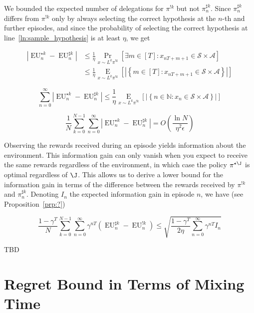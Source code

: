 \documentclass[anon,12pt]{colt2018} %
\newcommand{\AP}[1]{\left(#1\right)}
\newcommand{\AB}[1]{\left[#1\right]}
\newcommand{\AC}[1]{\left\{#1\right\}}
\newcommand{\Pa}[2]{\underset{#1}{\operatorname{Pr}}\AB{#2}}
\newcommand{\Ea}[2]{\underset{#1}{\operatorname{E}}\AB{#2}}
\newcommand{\Nats}{\mathbb{N}}
\newcommand{\Abs}[1]{\left\vert #1 \right\vert}
\newcommand{\A}{\mathcal{A}}
\newcommand{\St}{\mathcal{S}}
\newcommand{\EU}{\operatorname{EU}}
\begin{document}
We bounded the expected number of delegations for $\pi^{!k}$ but not $\pi^{\sharp k}_n$. Since $\pi^{\sharp k}_n$ differs from $\pi^{!k}$ only by always selecting the correct hypothesis at the $n$-th and further episodes, and since the probability of selecting the correct hypothesis at line~\ref{ln:sample_hypothesis} is at least $\eta$, we get

\begin{align*}
\Abs{\EU^{\star k}_n-\EU^{\sharp k}_n} &\leq \frac{1}{\eta}\Pa{x\sim L^k\pi^{!k}}{\exists m \in [T]: x_{nT+m+1}\in\St \times \A} \\ 
&\leq \frac{1}{\eta}\Ea{x\sim L^k\pi^{!k}}{\Abs{\AC{m \in [T]: x_{nT+m+1}\in\St \times \A}}}
\end{align*}

\[\sum_{n=0}^\infty {\Abs{\EU^{\star k}_n-\EU^{\sharp k}_n}} \leq \frac{1}{\eta}\Ea{x\sim L^k\pi^{!k}}{\Abs{\AC{n \in \Nats: x_n\in\St \times \A}}}\]

\begin{equation}
\frac{1}{N}\sum_{k=0}^{N-1}\sum_{n=0}^\infty {\Abs{\EU^{\star k}_n-\EU^{\sharp k}_n}} = O\AP{\frac{\ln{N}}{\eta^2\epsilon}}
\end{equation}

Observing the rewards received during an episode yields information about the environment. This information gain can only vanish when you expect to receive the same rewards regardless of the environment, in which case the policy $\pi^{\star\J}$ is optimal regardless of $\J$. This allows us to derive a lower bound for the information gain in terms of the difference between the rewards received by $\pi^{!k}$ and $\pi^{\sharp k}_n$. Denoting $I_n$ the expected information gain in episode $n$, we have (see Proposition~\ref{prp:?})

\begin{equation}
\frac{1-\gamma^T}{N}\sum_{k=0}^{N-1}\sum_{n=0}^\infty \gamma^{nT}\AP{\EU^{\sharp k}_n-\EU^{!k}_n} \leq \sqrt{\frac{1-\gamma^T}{2\eta}\sum_{n=0}^\infty \gamma^{nT}I_n}
\end{equation}

TBD






\appendix

\section{Regret Bound in Terms of Mixing Time}
\label{sec:mixing_time}
\end{document}
